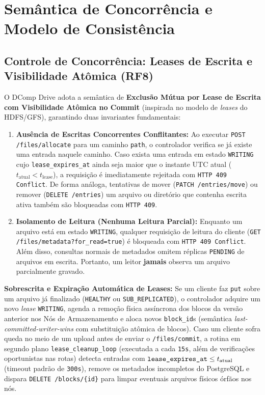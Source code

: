 \documentclass[10pt,a4paper]{article}
\begin{document}
\section{Semântica de Concorrência e Modelo de Consistência}

\subsection{Controle de Concorrência: Leases de Escrita e Visibilidade Atômica (RF8)}
O DComp Drive adota a semântica de \textbf{Exclusão Mútua por Lease de Escrita com Visibilidade Atômica no Commit} (inspirada no modelo de \textit{leases} do HDFS/GFS), garantindo duas invariantes fundamentais:
\begin{enumerate}
    \item \textbf{Ausência de Escritas Concorrentes Conflitantes:} Ao executar \texttt{POST /files/allocate} para um caminho \texttt{path}, o controlador verifica se já existe uma entrada naquele caminho. Caso exista uma entrada em estado \texttt{WRITING} cujo \texttt{lease\_expires\_at} ainda seja maior que o instante UTC atual ($t_{\text{atual}} < t_{\text{lease}}$), a requisição é imediatamente rejeitada com \texttt{HTTP 409 Conflict}. De forma análoga, tentativas de mover (\texttt{PATCH /entries/move}) ou remover (\texttt{DELETE /entries}) um arquivo ou diretório que contenha escrita ativa também são bloqueadas com \texttt{HTTP 409}.
    \item \textbf{Isolamento de Leitura (Nenhuma Leitura Parcial):} Enquanto um arquivo está em estado \texttt{WRITING}, qualquer requisição de leitura do cliente (\texttt{GET /files/metadata?for\_read=true}) é bloqueada com \texttt{HTTP 409 Conflict}. Além disso, consultas normais de metadados omitem réplicas \texttt{PENDING} de arquivos em escrita. Portanto, um leitor \textbf{jamais} observa um arquivo parcialmente gravado.
\end{enumerate}

\textbf{Sobrescrita e Expiração Automática de Leases:} Se um cliente faz \texttt{put} sobre um arquivo já finalizado (\texttt{HEALTHY} ou \texttt{SUB\_REPLICATED}), o controlador adquire um novo \textit{lease} \texttt{WRITING}, agenda a remoção física assíncrona dos blocos da versão anterior nos Nós de Armazenamento e aloca novos \texttt{block\_id}s (semântica \textit{last-committed-writer-wins} com substituição atômica de blocos). Caso um cliente sofra queda no meio de um upload antes de enviar o \texttt{/files/commit}, a rotina em segundo plano \texttt{lease\_cleanup\_loop} (executada a cada \texttt{15s}, além de verificações oportunistas nas rotas) detecta entradas com $\text{\texttt{lease\_expires\_at}} \le t_{\text{atual}}$ (timeout padrão de \texttt{300s}), remove os metadados incompletos do PostgreSQL e dispara \texttt{DELETE /blocks/\{id\}} para limpar eventuais arquivos físicos órfãos nos nós.
\end{document}
